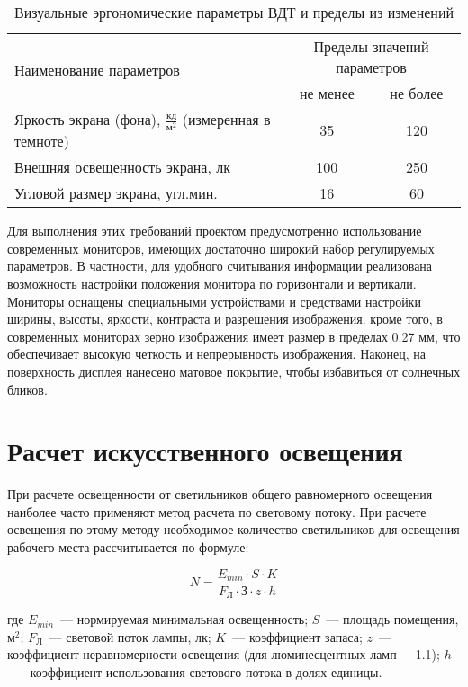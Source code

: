 \begin{table}[ht]
\caption{Визуальные эргономические параметры ВДТ и пределы из изменений}
\begin{tabular}{|l|c|c|}
\hline
\multirow{2}{*}{Наименование параметров} & \multicolumn{2}{c|}{Пределы значений параметров}\\
\cline{2-3}
&не менее&не более\\
\hline
Яркость экрана (фона), $\frac{\text{кд}}{\text{м}^2}$ (измеренная в темноте) &35&120\\
\hline
Внешняя освещенность экрана, лк &100&250\\
\hline
Угловой размер экрана, угл.мин. &16&60\\
\hline
\end{tabular}
\label{tab:ergonom}
\end{table}

Для выполнения этих требований проектом предусмотренно использование современных мониторов, имеющих достаточно широкий набор регулируемых параметров.  В частности, для удобного считывания информации реализована возможность настройки положения монитора по горизонтали и вертикали. Мониторы оснащены специальными устройствами и средствами настройки ширины, высоты, яркости, контраста и разрешения изображения. кроме того, в современных мониторах зерно изображения имеет размер в пределах 0.27 мм, что обеспечивает высокую четкость и непрерывность изображения. Наконец, на поверхность дисплея нанесено матовое покрытие, чтобы избавиться от солнечных бликов.

\section{Расчет искусственного освещения}

При расчете освещенности от светильников общего равномерного освещения наиболее часто применяют метод расчета по световому потоку. При расчете освещения по этому методу необходимое количество светильников для освещения рабочего места рассчитывается по формуле:

\begin{equation}
\label{f:lightsCount}
N = \frac{E_{min}\cdot S\cdot K}{F_\text{Л} \cdot \text{З} \cdot z \cdot h}
\end{equation}

где $E_{min}$~--- нормируемая минимальная освещенность; $S$~--- площадь помещения, $\text{м}^2$; $F_\text{Л}$~--- световой поток лампы, лк; $K$~--- коэффициент запаса; $z$~--- коэффициент неравномерности освещения (для люминесцентных ламп~---1.1); $h$~--- коэффициент использования светового потока в долях единицы.

